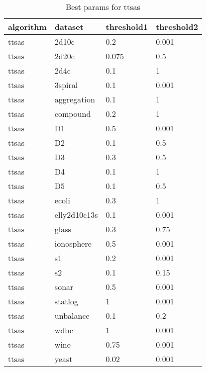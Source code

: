 \begin{table}[H]
\centering
\caption{Best params for ttsas}
\label{S47_Table}
\begin{tabular}{|l|l|l|l|}
\hline
algorithm & dataset & threshold1 & threshold2 \\
\hline
ttsas & 2d10c & 0.2 & 0.001 \\
\hline
ttsas & 2d20c & 0.075 & 0.5 \\
\hline
ttsas & 2d4c & 0.1 & 1 \\
\hline
ttsas & 3spiral & 0.1 & 0.001 \\
\hline
ttsas & aggregation & 0.1 & 1 \\
\hline
ttsas & compound & 0.2 & 1 \\
\hline
ttsas & D1 & 0.5 & 0.001 \\
\hline
ttsas & D2 & 0.1 & 0.5 \\
\hline
ttsas & D3 & 0.3 & 0.5 \\
\hline
ttsas & D4 & 0.1 & 1 \\
\hline
ttsas & D5 & 0.1 & 0.5 \\
\hline
ttsas & ecoli & 0.3 & 1 \\
\hline
ttsas & elly2d10c13s & 0.1 & 0.001 \\
\hline
ttsas & glass & 0.3 & 0.75 \\
\hline
ttsas & ionosphere & 0.5 & 0.001 \\
\hline
ttsas & s1 & 0.2 & 0.001 \\
\hline
ttsas & s2 & 0.1 & 0.15 \\
\hline
ttsas & sonar & 0.5 & 0.001 \\
\hline
ttsas & statlog & 1 & 0.001 \\
\hline
ttsas & unbalance & 0.1 & 0.2 \\
\hline
ttsas & wdbc & 1 & 0.001 \\
\hline
ttsas & wine & 0.75 & 0.001 \\
\hline
ttsas & yeast & 0.02 & 0.001 \\
\hline
\end{tabular}
\end{table}

\clearpage

